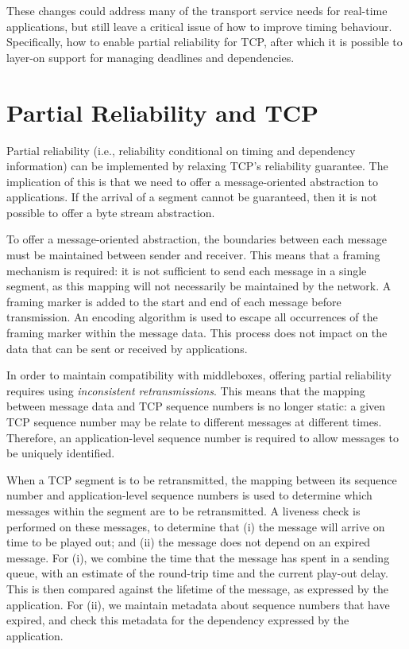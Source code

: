 \documentclass[10pt]{sig-alternate-05-2015}
\begin{document}
These changes could address many of the transport service needs for
real-time applications, but still leave a critical issue of how to improve
timing behaviour. Specifically, how to enable partial reliability for TCP,
after which it is possible to layer-on support for managing deadlines and
dependencies.

\section{Partial Reliability and TCP}
\label{sec:partial}

Partial reliability (i.e., reliability conditional on timing and dependency
information) can be implemented by relaxing TCP's reliability guarantee.
The implication of this is that we need to offer a message-oriented
abstraction to applications. If the arrival of a segment cannot be
guaranteed, then it is not possible to offer a byte stream abstraction.

To offer a message-oriented abstraction, the boundaries between each
message must be maintained between sender and receiver. This means that a
framing mechanism is required: it is not sufficient to send each message in
a single segment, as this mapping will not necessarily be maintained by the
network. A framing marker is added to the start and end of each message
before transmission. An encoding algorithm is used to escape all occurrences
of the framing marker within the message data. This process does not impact
on the data that can be sent or received by applications.

In order to maintain compatibility with middleboxes, offering partial
reliability requires using \emph{inconsistent retransmissions}. This means
that the mapping between message data and TCP sequence numbers is no longer
static: a given TCP sequence number may be relate to different messages at
different times. Therefore, an application-level sequence number is
required to allow messages to be uniquely identified.

When a TCP segment is to be retransmitted, the mapping between its
sequence number and application-level sequence numbers is used to determine
which messages within the segment are to be retransmitted. A liveness check
is performed on these messages, to determine that (i) the message will
arrive on time to be played out; and (ii) the message does not depend on an
expired message. For (i), we combine the time that the message has spent in
a sending queue, with an estimate of the round-trip time and the current
play-out delay. This is then compared against the lifetime of the message,
as expressed by the application. For (ii), we maintain metadata about
sequence numbers that have expired, and check this metadata for the
dependency expressed by the application.
\end{document}
